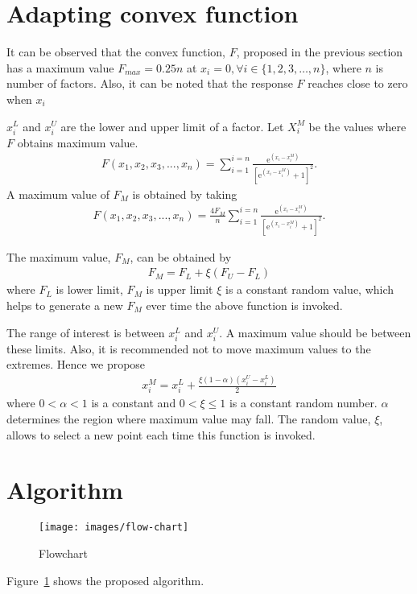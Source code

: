 \documentclass[twocolumn]{svjour3}          %
\newcommand{\me}{\mathrm{e}}
\begin{document}
	\section{Adapting convex function}
	\label{Sec:Adapting}
	It can be observed that the convex function, $F$, proposed in the previous section has a maximum value $F_{max}=0.25n$ at $x_i=0, \forall i\in\{1, 2, 3, \dots, n\}$, where $n$ is number of factors. Also, it can be noted that the response $F$ reaches close to zero when $x_i$
	\par
	$x_i^L$ and $x_i^U$ are the lower and upper limit of a factor. Let $X_i^M$ be the values where $F$ obtains maximum value.
	\begin{eqnarray}
	F(x_1, x_2, x_3, ..., x_n) = \sum_{i=1}^{i=n}{\frac{\me^{(x_i-x_i^M)}}{[\me^{(x_i-x_i^M)}+1]^2}}. \label{Eqn:DiffSigmoidMultiChangeMaxPoint}
	\end{eqnarray}
	A maximum value of $F_M$ is obtained by taking
	\begin{eqnarray}
	F(x_1, x_2, x_3, ..., x_n) = \frac{4F_M}{n}\sum_{i=1}^{i=n}{\frac{\me^{(x_i-x_i^M)}}{[\me^{(x_i-x_i^M)}+1]^2}}. \label{Eqn:DiffSigmoidMultiChangeMaxValue}
	\end{eqnarray}
	\par
	The maximum value, $F_M$, can be obtained by
	\begin{eqnarray}
	F_M = F_L + \xi(F_U-F_L) \label{Eqn:MaxValueSelection}
	\end{eqnarray}
	where $F_L$ is lower limit, $F_M$ is upper limit $\xi$ is a constant random value, which helps to generate a new $F_M$ ever time the above function is invoked.
	\par
	The range of interest is between $x_i^L$ and $x_i^U$. A maximum value should be between these limits. Also, it is recommended not to move maximum values to the extremes. Hence we propose
	\begin{eqnarray}
	x_i^M = x_i^L + \frac{\xi(1-\alpha)(x_i^U-x_i^L)}{2} \label{Eqn:MaxPointSelection}
	\end{eqnarray}
	where $0<\alpha <1$ is a constant and $0<\xi\le 1$ is a constant random number. $\alpha$ determines the region where maximum value may fall. The random value, $\xi$, allows to select a new point each time this function is invoked.
	\section{Algorithm}
	\label{Sec:Algorithm}
	\begin{figure}
		\centering
		\texttt{[image: images/flow-chart]}
		\label{Fig:Flowchart}
		\caption{Flowchart}
	\end{figure}
	Figure~\ref{Fig:Flowchart} shows the proposed algorithm.
\end{document}
